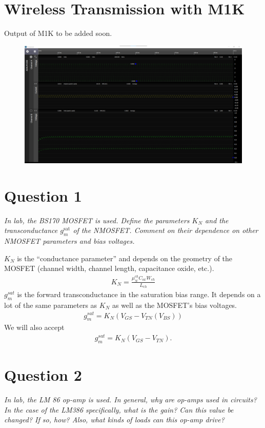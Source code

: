 \documentclass[12pt]{../manual}
\begin{document}
\newpage
\section{Wireless Transmission with M1K}
Output of M1K to be added soon.
\begin{figure}[ht!]
\begin{center}
\includegraphics[width=\textwidth]{figures/M1KSolution}
\end{center}
\end{figure}

\newpage
\section{Question 1}
\textit{In lab, the BS170 MOSFET is used. Define the parameters $K_N$ and the transconductance $g_m^\mathrm{sat}$ of the NMOSFET. Comment on their dependence on other NMOSFET parameters and bias voltages.}

$K_N$ is the ``conductance parameter'' and depends on the geometry of the MOSFET (channel width, channel length, capacitance oxide, etc.).
\begin{align}
K_N = \frac{\mu_N^{ch}C_{ox}W_{ch}}{L_{ch}}
\end{align}
$g_m^{sat}$ is the forward transconductance in the saturation bias range. It depends on a lot of the same parameters as $K_N$ as well as the MOSFET's bias voltages.
\begin{align}
g_m^{sat} = K_N \left( V_{GS} - V_{TN}(V_{BS}) \right)
\end{align}
We will also accept
\begin{align}
g_m^{sat} = K_N \left( V_{GS} - V_{TN} \right).
\end{align}
\section{Question 2}
\textit{In lab, the LM 86 op-amp is used. In general, why are op-amps used in circuits? In the case of the LM386 specifically, what is the gain? Can this value be changed? If so, how? Also, what kinds of loads can this op-amp drive?}
\end{document}
